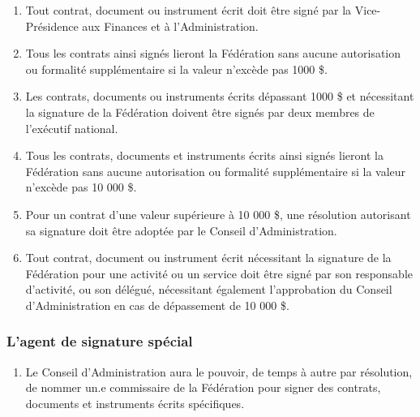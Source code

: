 \begin{enumerate}
 \item
  Tout contrat, document ou instrument écrit doit être signé par la Vice-Présidence aux Finances et à l’Administration.
 \item
  Tous les contrats ainsi signés lieront la Fédération sans aucune autorisation ou formalité supplémentaire si la valeur n'excède pas 1000 \$.
 \item
  Les contrats, documents ou instruments écrits dépassant 1000 \$ et nécessitant la signature de la Fédération doivent être signés par deux membres de l'exécutif national.
 \item
  Tous les contrats, documents et instruments écrits ainsi signés lieront la Fédération sans aucune autorisation ou formalité supplémentaire si la valeur n'excède pas 10 000 \$.
 \item
  Pour un contrat d'une valeur supérieure à 10 000 \$, une résolution autorisant sa signature doit être adoptée par le Conseil d'Administration.
 \item
  Tout contrat, document ou instrument écrit nécessitant la signature de la Fédération pour une activité ou un service doit être signé par son responsable d'activité, ou son délégué, nécessitant également l'approbation du Conseil d'Administration en cas de dépassement de 10 000 \$.
\end{enumerate}

\subsubsection{L'agent de signature spécial}
\label{l-agent-de-signature-special}

\begin{enumerate}
 \item
  Le Conseil d'Administration aura le pouvoir, de temps à autre par résolution, de nommer un.e commissaire de la Fédération pour signer des contrats, documents et instruments écrits spécifiques.
\end{enumerate}
